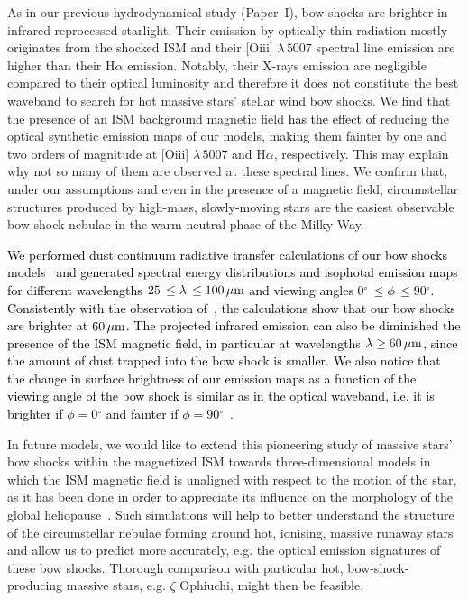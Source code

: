 \documentclass[useAMS,usenatbib]{mn2e}
\newcommand{\degree}{\ensuremath{^\circ}}
\begin{document}
As in our previous hydrodynamical study (Paper~I), bow shocks are brighter
in infrared reprocessed starlight. Their emission by optically-thin radiation
mostly originates from the shocked ISM and their [O{\sc iii}] $\lambda \, 5007$
spectral line emission are higher than their H$\alpha$ emission. Notably, their 
X-rays emission are negligible compared to their optical luminosity and
therefore it does not constitute the best waveband to search for hot massive stars'
stellar wind bow shocks. We find that the presence of an ISM background 
magnetic field \textcolor{black}{has the effect of} reducing the optical 
synthetic emission maps of our models, 
making them fainter by one and two orders
of magnitude at [O{\sc iii}] $\lambda \, 5007$ and H$\alpha$, respectively. This
may explain why not so many of them are observed at these spectral lines. We
confirm that, under our assumptions and even in the presence of a magnetic field, 
circumstellar structures produced by high-mass, slowly-moving stars are the 
easiest observable bow shock nebulae in the warm neutral phase of the Milky Way. 


\textcolor{black}{
We performed dust continuum radiative transfer calculations of our bow 
shocks models~\citep[cf.][]{acreman_mnras_456_2016} and generated spectral 
energy distributions and isophotal emission maps for different wavelengths $25\, 
\le \lambda\, \le 100\, \mu\rm m$ and viewing angles $0\degree\, \le \phi\, \le 90\degree$. 
Consistently with the observation of~\citet{buren_apj_329_1988,vanburen_aj_110_1995,noriegacrespo_aj_113_1997}, 
the calculations show that our bow shocks are brighter at $60\, \mu\rm m$. 
The projected infrared emission can also be diminished the presence of the ISM magnetic field, 
in particular at wavelengths $\lambda\ge 60\, \mu\rm m$, since the amount of 
dust trapped into the bow shock is smaller. We also notice that 
the change in surface brightness of our emission maps as a function of 
the viewing angle of the bow shock is similar as in the optical waveband, i.e. it 
is brighter if $\phi=0\degree$ and fainter if $\phi=90\degree$~\citep[see][]{meyer_mnras_459_2016}. 
}


In future models, we would like to extend this pioneering study of 
massive stars' bow shocks within the magnetized ISM towards 
three-dimensional models in which the ISM magnetic field is unaligned with
respect to the motion of the star, as it has been done in order to appreciate
its influence on the morphology of the global
heliopause~\citep{pogorelov_JGR_103_1998}. Such simulations will help to
better understand the structure of the circumstellar nebulae forming
around hot, ionising, massive runaway stars and allow us to predict more
accurately, e.g. the optical emission signatures of these bow shocks.
Thorough comparison with particular hot, bow-shock-producing massive stars, 
e.g. $\zeta$ Ophiuchi, might then be feasible. 
\end{document}
